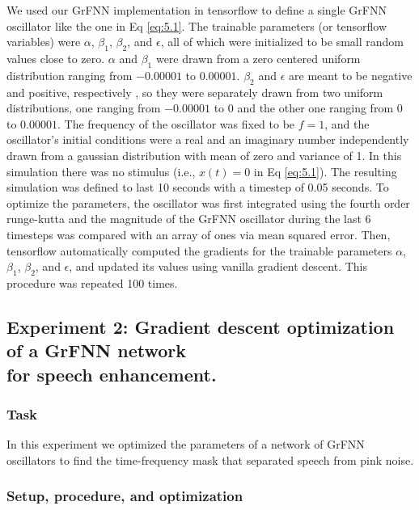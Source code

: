 \documentclass{report}
\begin{document}
We used our GrFNN implementation in tensorflow to define a single GrFNN oscillator like the one in Eq \eqref{eq:5.1}. The trainable parameters (or tensorflow variables) were $\alpha$, $\beta_1$, $\beta_2$, and $\epsilon$, all of which were initialized to be small random values close to zero. $\alpha$ and $\beta_1$ were drawn from a zero centered uniform distribution ranging from $-0.00001$ to $0.00001$. $\beta_2$ and $\epsilon$ are meant to be negative and positive, respectively \cite{kim2015signal}, so they were separately drawn from two uniform distributions, one ranging from $-0.00001$ to $0$ and the other one ranging from $0$ to $0.00001$. The frequency of the oscillator was fixed to be $f=1$, and the oscillator's initial conditions were a real and an imaginary number independently drawn from a gaussian distribution with mean of zero and variance of 1. In this simulation there was no stimulus (i.e., $x(t)=0$ in Eq \eqref{eq:5.1}). The resulting simulation was defined to last 10 seconds with a timestep of 0.05 seconds. To optimize the parameters, the oscillator was first integrated using the fourth order runge-kutta and the magnitude of the GrFNN oscillator during the last 6 timesteps was compared with an array of ones via mean squared error. Then, tensorflow automatically computed the gradients for the trainable parameters $\alpha$, $\beta_1$, $\beta_2$, and $\epsilon$, and updated its values using vanilla gradient descent. This procedure was repeated 100 times. 

\subsection{Experiment 2: Gradient descent optimization of a GrFNN network \\ for speech enhancement.} 

\subsubsection{Task}

In this experiment we optimized the parameters of a network of GrFNN oscillators to find the time-frequency mask that separated speech from pink noise.

\subsubsection{Setup, procedure, and optimization}
\end{document}
